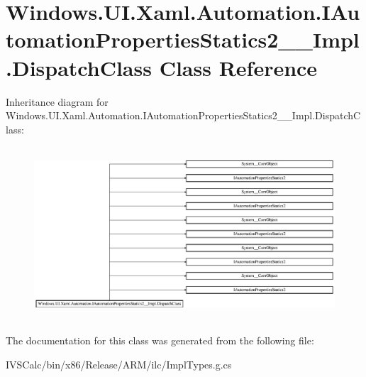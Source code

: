 \hypertarget{class_windows_1_1_u_i_1_1_xaml_1_1_automation_1_1_i_automation_properties_statics2_____impl_1_1_dispatch_class}{}\section{Windows.\+U\+I.\+Xaml.\+Automation.\+I\+Automation\+Properties\+Statics2\+\_\+\+\_\+\+Impl.\+Dispatch\+Class Class Reference}
\label{class_windows_1_1_u_i_1_1_xaml_1_1_automation_1_1_i_automation_properties_statics2_____impl_1_1_dispatch_class}
Inheritance diagram for Windows.\+U\+I.\+Xaml.\+Automation.\+I\+Automation\+Properties\+Statics2\+\_\+\+\_\+\+Impl.\+Dispatch\+Class\+:\begin{figure}[H]
\begin{center}
\leavevmode
\includegraphics[height=6.497890cm]{class_windows_1_1_u_i_1_1_xaml_1_1_automation_1_1_i_automation_properties_statics2_____impl_1_1_dispatch_class}
\end{center}
\end{figure}


The documentation for this class was generated from the following file\+:\begin{DoxyCompactItemize}
\item 
I\+V\+S\+Calc/bin/x86/\+Release/\+A\+R\+M/ilc/Impl\+Types.\+g.\+cs\end{DoxyCompactItemize}
